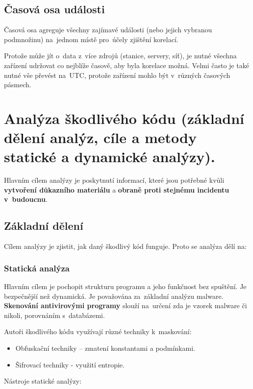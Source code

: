 \subsection{Časová osa události}

Časová osa agreguje všechny zajímavé události (nebo jejich vybranou podmnožinu) na~jednom místě pro~účely zjištění korelací.

Protože může jít o~data z~více zdrojů (stanice, servery, síť), je nutné všechna zařízení udržovat co nejblíže časově, aby byla korelace možná.
Velmi často je také nutné vše převést na~UTC, protože zařízení mohlo být v~různých časových pásmech.


\clearpage
\section{Analýza škodlivého kódu (základní dělení analýz, cíle a metody statické a dynamické analýzy).}

Hlavním cílem analýzy je poskytnutí informací, které jsou potřebné kvůli \textbf{vytvoření důkazního materiálu} a \textbf{obraně proti stejnému incidentu v~budoucnu}.  

\subsection{Základní dělení}

Cílem analýzy je zjistit, jak daný škodlivý kód funguje. Proto se analýza dělí na:

\subsubsection{Statická analýza}

Hlavním cílem je pochopit strukturu programu a jeho funkčnost bez spuštění.
Je bezpečnější než dynamická.
Je považována za~základní analýzu malware.
\textbf{Skenování antivirovými programy} slouží na~určení zda je vzorek malware či nikoli, porovnáním s~databázemi.

Autoři škodlivého kódu využívají různé techniky k~maskování:

\begin{itemize}
    \item Obfuskační techniky -- zmatení konstantami a podmínkami.
    \item Šifrovací techniky - využití entropie.
\end{itemize}

Nástroje statické analýzy:

